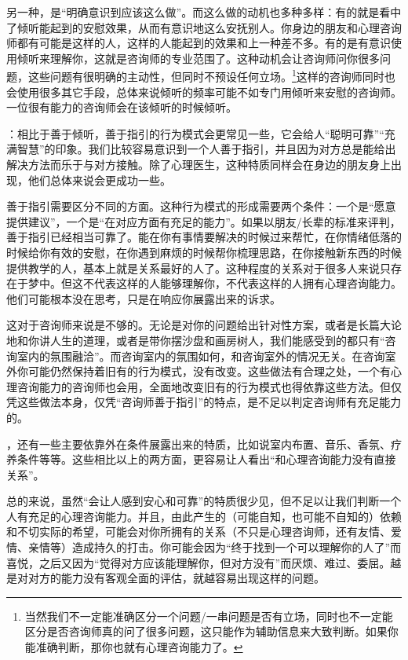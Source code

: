 另一种，是“明确意识到应该这么做”。而这么做的动机也多种多样：有的就是看中了倾听能起到的安慰效果，从而有意识地这么安抚别人。你身边的朋友和心理咨询师都有可能是这样的人，这样的人能起到的效果和上一种差不多。有的是有意识使用倾听来理解你，这就是咨询师的专业范围了。这种动机会让咨询师问你很多问题，这些问题有很明确的主动性，但同时不预设任何立场。\footnote{当然我们不一定能准确区分一个问题/一串问题是否有立场，同时也不一定能区分是否咨询师真的问了很多问题，这只能作为辅助信息来大致判断。如果你能准确判断，那你也就有心理咨询能力了。}这样的咨询师同时也会使用很多其它手段，总体来说倾听的频率可能不如专门用倾听来安慰的咨询师。一位很有能力的咨询师会在该倾听的时候倾听。

：相比于善于倾听，善于指引的行为模式会更常见一些，它会给人“聪明可靠”“充满智慧”的印象。我们比较容易意识到一个人善于指引，并且因为对方总是能给出解决方法而乐于与对方接触。除了心理医生，这种特质同样会在身边的朋友身上出现，他们总体来说会更成功一些。

善于指引需要区分不同的方面。这种行为模式的形成需要两个条件：一个是“愿意提供建议”，一个是“在对应方面有充足的能力”。如果以朋友/长辈的标准来评判，善于指引已经相当可靠了。能在你有事情要解决的时候过来帮忙，在你情绪低落的时候给你有效的安慰，在你遇到麻烦的时候帮你梳理思路，在你接触新东西的时候提供教学的人，基本上就是关系最好的人了。这种程度的关系对于很多人来说只存在于梦中。但这不代表这样的人能够理解你，不代表这样的人拥有心理咨询能力。他们可能根本没在思考，只是在响应你展露出来的诉求。

这对于咨询师来说是不够的。无论是对你的问题给出针对性方案，或者是长篇大论地和你讲人生的道理，或者是带你摆沙盘和画房树人，我们能感受到的都只有“咨询室内的氛围融洽”。而咨询室内的氛围如何，和咨询室外的情况无关。在咨询室外你可能仍然保持着旧有的行为模式，没有改变。这些做法有合理之处，一个有心理咨询能力的咨询师也会用，全面地改变旧有的行为模式也得依靠这些方法。但仅凭这些做法本身，仅凭“咨询师善于指引”的特点，是不足以判定咨询师有充足能力的。

，还有一些主要依靠外在条件展露出来的特质，比如说室内布置、音乐、香氛、疗养条件等等。这些相比以上的两方面，更容易让人看出“和心理咨询能力没有直接关系”。

总的来说，虽然“会让人感到安心和可靠”的特质很少见，但不足以让我们判断一个人有充足的心理咨询能力。并且，由此产生的（可能自知，也可能不自知的）依赖和不切实际的希望，可能会对你所拥有的关系（不只是心理咨询师，还有友情、爱情、亲情等）造成持久的打击。你可能会因为“终于找到一个可以理解你的人了”而喜悦，之后又因为“觉得对方应该能理解你，但对方没有”而厌烦、难过、委屈。越是对对方的能力没有客观全面的评估，就越容易出现这样的问题。

